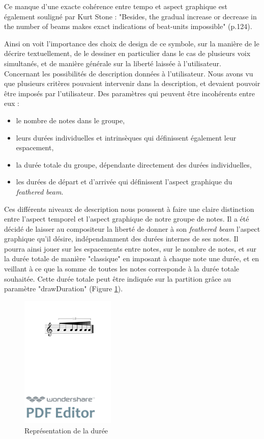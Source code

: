 \documentclass{article}
\newenvironment{gmncode}	{\vspace{-2mm}\small\verbatim}{\endverbatim\vspace{-2mm}}
\begin{document}
Ce manque d'une exacte cohérence entre tempo et aspect graphique est également souligné par Kurt Stone \cite{stone1980music} : "Besides, the gradual increase or decrease in the number of beams makes exact indications of beat-units impossible" (p.124).

Ainsi on voit l'importance des choix de design de ce symbole, sur la manière de le décrire textuellement, de le dessiner en particulier dans le cas de plusieurs voix simultanés, et de manière générale sur la liberté laissée à l'utilisateur.
\\

Concernant les possibilités de description données à l'utilisateur. Nous avons vu que plusieurs critères pouvaient intervenir dans la description, et devaient pouvoir être imposés par l'utilisateur. Des paramètres qui peuvent être incohérents entre eux :
\begin{itemize}
\item le nombre de notes dans le groupe,
\item leurs durées individuelles et intrinsèques qui définissent également leur espacement,
\item la durée totale du groupe, dépendante directement des durées individuelles,
\item les durées de départ et d'arrivée qui définissent l'aspect graphique du \emph{feathered beam}.
\end{itemize}
\bigskip

Ces différents niveaux de description nous poussent à faire une claire distinction entre l'aspect temporel et l'aspect graphique de notre groupe de notes.  Il a été décidé de laisser au compositeur la liberté de donner à son \emph{feathered beam} l'aspect graphique qu'il désire, indépendamment des durées internes de ses notes. Il pourra ainsi jouer sur les espacements entre notes, sur le nombre de notes, et sur la durée totale de manière "classique" en imposant à chaque note une durée, et en veillant à ce que la somme de toutes les notes corresponde à la durée totale souhaitée. Cette durée totale peut être indiquée sur la partition grâce au paramètre "drawDuration" (Figure \ref{fig:fbeamduree}).

\begin{figure}[h]
\centering
\begin{gmncode}
[ 
  \fBeam<drawDuration="true">
  ( a/8 a a/16 a a a/32 a ) 
]
\end{gmncode}
\includegraphics[width=45mm]{img/fbeamduree.pdf}
\caption{Représentation de la durée}
\label{fig:fbeamduree}
\end{figure}
\end{document}
